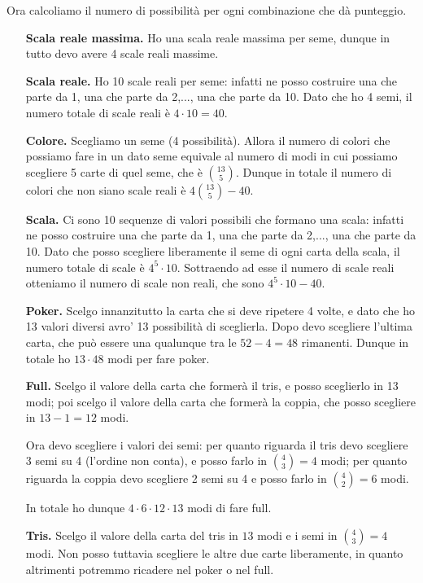 Ora calcoliamo il numero di possibilità per ogni combinazione che dà punteggio.
\begin{itemize}
    \item[\textbf{Scala reale massima.}] Ho una scala reale massima per seme, dunque in tutto devo avere 4 scale reali massime.
    \item[\textbf{Scala reale.}] Ho 10 scale reali per seme: infatti ne posso costruire una che parte da 1, una che parte da 2,..., una che parte da 10. Dato che ho 4 semi, il numero totale di scale reali è $4 \cdot 10 = 40$. 
    \item[\textbf{Colore.}] Scegliamo un seme (4 possibilità). Allora il numero di colori che possiamo fare in un dato seme equivale al numero di modi in cui possiamo scegliere 5 carte di quel seme, che è $\binom{13}{5}$. Dunque in totale il numero di colori che non siano scale reali è $4\binom{13}{5}-40$.
    \item[\textbf{Scala.}] Ci sono 10 sequenze di valori possibili che formano una scala: infatti ne posso costruire una che parte da 1, una che parte da 2,..., una che parte da 10. Dato che posso scegliere liberamente il seme di ogni carta della scala, il numero totale di scale è $4^5 \cdot 10$. Sottraendo ad esse il numero di scale reali otteniamo il numero di scale non reali, che sono $4^5 \cdot 10 - 40$.
    \item[\textbf{Poker.}] Scelgo innanzitutto la carta che si deve ripetere 4 volte, e dato che ho 13 valori diversi avro' 13 possibilità di sceglierla. Dopo devo scegliere l'ultima carta, che può essere una qualunque tra le $52 - 4 = 48$ rimanenti. Dunque in totale ho $13\cdot 48$ modi per fare poker.
    \item[\textbf{Full.}] Scelgo il valore della carta che formerà il tris, e posso sceglierlo in 13 modi; poi scelgo il valore della carta che formerà la coppia, che posso scegliere in $13-1 = 12$ modi. 
    
    Ora devo scegliere i valori dei semi: per quanto riguarda il tris devo scegliere 3 semi su 4 (l'ordine non conta), e posso farlo in $\binom{4}{3} = 4$ modi; per quanto riguarda la coppia devo scegliere 2 semi su 4 e posso farlo in $\binom{4}{2} = 6$ modi. 
    
    In totale ho dunque $4\cdot 6\cdot 12 \cdot 13$ modi di fare full. 
    \item[\textbf{Tris.}] Scelgo il valore della carta del tris in $13$ modi e i semi in $\binom{4}{3} = 4$ modi. Non posso tuttavia scegliere le altre due carte liberamente, in quanto altrimenti potremmo ricadere nel poker o nel full. 
    

\end{itemize}
